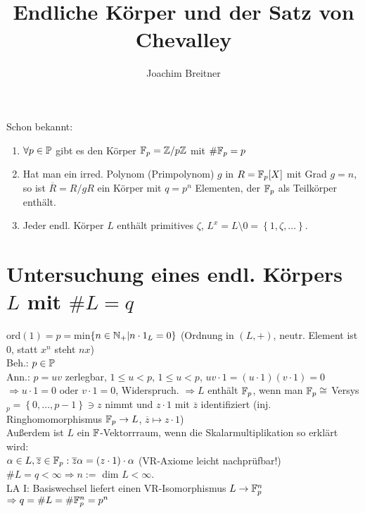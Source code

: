 \documentclass[a4paper,DIV15,BCOR12mm]{article}
\author{Joachim Breitner}
\title{Endliche Körper und der Satz von Chevalley}
\begin{document}
\maketitle

Schon bekannt:
\begin{enumerate}
\item $\forall p \in \mathbb{P}$ gibt es den Körper $\mathbb{F}_p = \mathbb{Z}/p\mathbb{Z}$ mit $\#\mathbb{F}_p=p$
\item Hat man ein irred. Polynom (Primpolynom) $g$ in $R = \mathbb{F}_p[X]$ mit Grad $g = n$, so ist $\overline R = R/gR$ ein Körper mit $q=p^n$ Elementen, der $\mathbb{F}_p$ als Teilkörper enthält.
\item Jeder endl. Körper $L$ enthält primitives $\zeta$, $L^x = L\setminus 0 = \left\{1,\zeta,...\right\}$.
\end{enumerate}

\section{Untersuchung eines endl. Körpers $L$ mit $\#L=q$}
ord$(1)=p=$min$\left\{n \in \mathbb{N}_+ | n \cdot 1_L = 0\right\}$ (Ordnung in $(L,+)$, neutr. Element ist $0$, statt $x^n$ steht $nx$)\\
Beh.: $p \in \mathbb{P}$\\
Ann.: $p=uv$ zerlegbar, $1\leq u < p$, $1\leq u < p$, $uv \cdot 1 = (u\cdot 1)(v\cdot 1) = 0$ \\ $\Rightarrow u\cdot 1=0$ oder $v \cdot 1 = 0$, Widerspruch.
$\Rightarrow L$ enthält $\mathbb{F}_p$, wenn man $\mathbb{F}_p \cong $ Versys$_p = \left\{0,\dotsc,p-1\right\} \ni z$ nimmt und $z \cdot 1$ mit $\overline{z}$ identifiziert (inj. Ringhomomorphismus $\mathbb{F}_p \to L$, $\overline{z} \mapsto z \cdot 1$) \\
Außerdem ist $L$ ein $\mathbb{F}$-Vektorrraum, wenn die Skalarmultiplikation so erklärt wird: \\
$\alpha \in L,\overline{z} \in \mathbb{F}_p:\overline{z}\alpha = (z\cdot 1) \cdot \alpha$ (VR-Axiome leicht nachprüfbar!)\\
$\#L=q < \infty \Rightarrow n :=$ dim $L < \infty$.\\
LA I: Basiswechsel liefert einen VR-Isomorphismus $L \to \mathbb{F}_p^n$ \\
$\Rightarrow q = \#L = \#\mathbb{F}_p^n = p^n$
\end{document}
